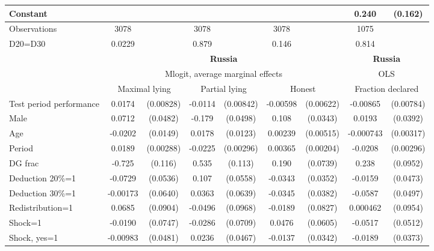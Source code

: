 \begin{tabular}{l|cccccc|cc}
Constant        &                  &         &                  &         &                  &         &    0.240         &  (0.162)\\
\hline
Observations    &     3078         &         &     3078         &         &     3078         &         &     1075         &         \\
D20=D30         &   0.0229         &         &    0.879         &         &    0.146         &         &    0.814         &         \\
\hline\hline
&\multicolumn{6}{c|}{\bf Russia}&\multicolumn{2}{c}{\bf Russia}\\ &\multicolumn{6}{c|}{Mlogit, average marginal effects }&\multicolumn{2}{c}{OLS}\\
                &\multicolumn{2}{c}{Maximal lying}&\multicolumn{2}{c}{Partial lying}&\multicolumn{2}{c}{Honest}  &\multicolumn{2}{c}{Fraction declared}\\
\hline
Test period performance&   0.0174\sym{**} &(0.00828)&  -0.0114         &(0.00842)& -0.00598         &(0.00622)& -0.00865         &(0.00784)\\
Male            &   0.0712         & (0.0482)&   -0.179\sym{***}& (0.0498)&    0.108\sym{***}& (0.0343)&   0.0193         & (0.0392)\\
Age             &  -0.0202         & (0.0149)&   0.0178         & (0.0123)&  0.00239         &(0.00515)&-0.000743         &(0.00317)\\
Period          &   0.0189\sym{***}&(0.00288)&  -0.0225\sym{***}&(0.00296)&  0.00365\sym{*}  &(0.00204)&  -0.0208\sym{***}&(0.00296)\\
DG frac         &   -0.725\sym{***}&  (0.116)&    0.535\sym{***}&  (0.113)&    0.190\sym{**} & (0.0739)&    0.238\sym{**} & (0.0952)\\
Deduction 20\%=1&  -0.0729         & (0.0536)&    0.107\sym{*}  & (0.0558)&  -0.0343         & (0.0352)&  -0.0159         & (0.0473)\\
Deduction 30\%=1& -0.00173         & (0.0640)&   0.0363         & (0.0639)&  -0.0345         & (0.0382)&  -0.0587         & (0.0497)\\
Redistribution=1&   0.0685         & (0.0904)&  -0.0496         & (0.0968)&  -0.0189         & (0.0827)& 0.000462         & (0.0954)\\
Shock=1         &  -0.0190         & (0.0747)&  -0.0286         & (0.0709)&   0.0476         & (0.0605)&  -0.0517         & (0.0512)\\
Shock, yes=1    & -0.00983         & (0.0481)&   0.0236         & (0.0467)&  -0.0137         & (0.0342)&  -0.0189         & (0.0373)\\

\end{tabular}
